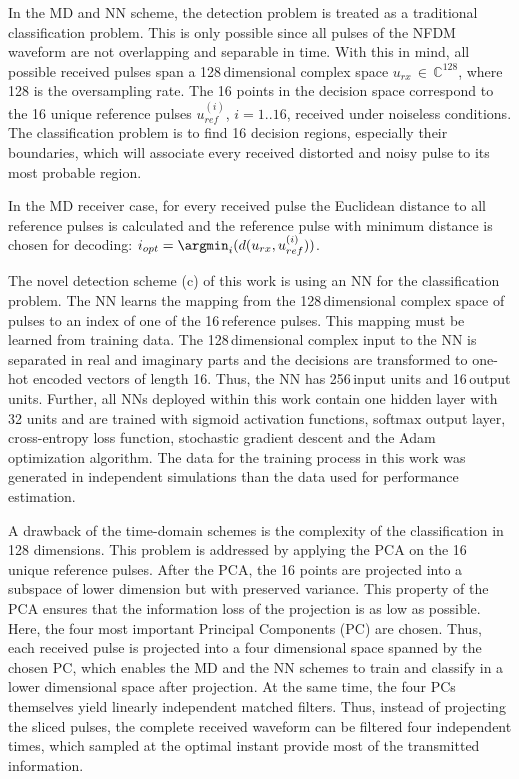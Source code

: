 In the MD and NN scheme, the detection problem is treated as a traditional classification problem. This is only possible since all pulses of the NFDM waveform are not overlapping and separable in time. With this in mind, all possible received pulses span a 128\,dimensional complex space $u_{rx}\,\in\,\mathbb{C}^{128}$, where 128 is the oversampling rate. The 16 points in the decision space correspond to the 16 unique reference pulses $u^{(i)}_{ref}$, $i=1..16$, received under noiseless conditions. The classification problem is to find 16 decision regions, especially their boundaries, which will associate every received distorted and noisy pulse to its most probable region.

In the MD receiver case, for every received pulse the Euclidean distance to all reference pulses is calculated and the reference pulse with minimum distance is chosen for decoding: $i_{opt}=\argmin_i(d(u_{rx},u^{(i)}_{ref}))$.

The novel detection scheme (c) of this work is using an NN for the classification problem. The NN learns the mapping from the 128\,dimensional complex space of pulses to an index of one of the 16\,reference pulses. This mapping must be learned from training data. The 128\,dimensional complex input to the NN is separated in real and imaginary parts and the decisions are transformed to one-hot encoded vectors of length 16. Thus, the NN has 256\,input units and 16\,output units. Further, all NNs deployed within this work contain one hidden layer with 32 units and are trained with sigmoid activation functions, softmax output layer, cross-entropy loss function, stochastic gradient descent and the Adam optimization algorithm\cite{bishop06, goodfellow16}. The data for the training process in this work was generated in independent simulations than the data used for performance estimation.

A drawback of the time-domain schemes is the complexity of the classification in 128 dimensions. This problem is addressed by applying the PCA on the 16 unique reference pulses. After the PCA, the 16 points are projected into a subspace of lower dimension but with preserved variance\cite{bishop06}. This property of the PCA ensures that the information loss of the projection is as low as possible. Here, the four most important Principal Components (PC) are chosen. Thus, each received pulse is projected into a four dimensional space spanned by the chosen PC, which enables the MD and the NN schemes to train and classify in a lower dimensional space after projection. At the same time, the four PCs themselves yield linearly independent matched filters. Thus, instead of projecting the sliced pulses, the complete received waveform can be filtered four independent times, which sampled at the optimal instant provide most of the transmitted information.

